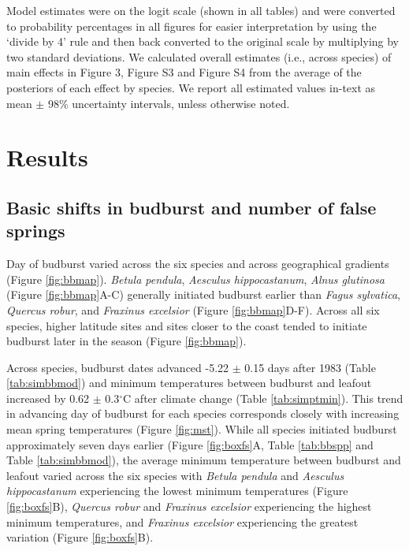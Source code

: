 \documentclass{article}\usepackage[]{graphicx}\usepackage[]{color}
\begin{document}
Model estimates were on the logit scale (shown in all tables) and were converted to probability percentages in all figures for easier interpretation by using the `divide by 4' rule \citep{Gelman2006} and then back converted to the original scale by multiplying by two standard deviations. We calculated overall estimates (i.e., across species) of main effects in Figure 3, Figure S3 and Figure S4 from the average of the posteriors of each effect by species. We report all estimated values in-text as mean $\pm$ 98\% uncertainty intervals, unless otherwise noted. %

\section*{Results}
\subsection*{Basic shifts in budburst and number of false springs}
Day of budburst varied across the six species and across geographical gradients (Figure \ref{fig:bbmap}). \textit{Betula pendula}, \textit{Aesculus hippocastanum}, \textit{Alnus glutinosa} (Figure \ref{fig:bbmap}A-C) generally initiated budburst earlier than \textit{Fagus sylvatica}, \textit{Quercus robur}, and \textit{Fraxinus excelsior} (Figure \ref{fig:bbmap}D-F). Across all six species, higher latitude sites and sites closer to the coast tended to initiate budburst later in the season (Figure \ref{fig:bbmap}).  

Across species, budburst dates advanced -5.22 $\pm$ 0.15 days after 1983 (Table \ref{tab:simbbmod}) and minimum temperatures between budburst and leafout increased by 0.62 $\pm$ 0.3$^{\circ}$C after climate change (Table \ref{tab:simptmin}). This trend in advancing day of budburst for each species corresponds closely with increasing mean spring temperatures (Figure \ref{fig:mst}). While all species initiated budburst approximately seven days earlier (Figure \ref{fig:boxfs}A, Table \ref{tab:bbspp} and Table \ref{tab:simbbmod}), the average minimum temperature between budburst and leafout varied across the six species with \textit{Betula pendula} and \textit{Aesculus hippocastanum} experiencing the lowest minimum temperatures (Figure \ref{fig:boxfs}B), \textit{Quercus robur} and \textit{Fraxinus excelsior} experiencing the highest minimum temperatures, and \textit{Fraxinus excelsior} experiencing the greatest variation (Figure \ref{fig:boxfs}B). 
\end{document}
